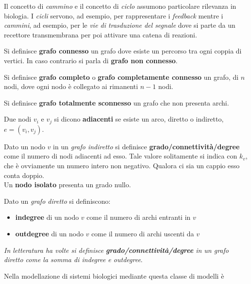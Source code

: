 \documentclass[a4paper,12pt, oneside]{book}
\begin{document}
Il concetto di \textit{cammino} e il concetto di \textit{ciclo} assumono
particolare rilevanza in biologia. I \textit{cicli} servono, ad esempio, per
rappresentare i \textit{feedback} mentre i \textit{cammini}, ad esempio, per le
\textit{vie di trasduzione del segnale} dove si parte da un recettore
transmembrana per poi attivare una catena di reazioni.
\begin{definizione}
  Si definisce \textbf{grafo connesso} un grafo dove esiste un percorso tra ogni
  coppia di vertici. In caso contrario si parla di \textbf{grafo non connesso}.
\end{definizione}
\begin{definizione}
  Si definisce \textbf{grafo completo} o \textbf{grafo completamente connesso}
  un grafo, di $n$ nodi, dove ogni nodo è collegato ai rimanenti $n-1$ nodi.
\end{definizione}
\begin{definizione}
  Si definisce \textbf{grafo totalmente sconnesso} un grafo che non presenta
  archi.  
\end{definizione}
\begin{definizione}
  Due nodi $v_i$ e $v_j$ si dicono \textbf{adiacenti} se esiste un arco, diretto
  o indiretto, $e=(v_i, v_j)$.
\end{definizione}
\begin{definizione}
  Dato un nodo $v$ in un \textit{grafo indiretto} si definisce
  \textbf{grado/connettività/degree} come il 
  numero di 
  nodi adiacenti ad esso. Tale valore solitamente si indica con $k_v$, che è
  ovviamente un numero intero non negativo. Qualora ci sia un cappio esso conta
  doppio.\\
  Un \textbf{nodo isolato} presenta un grado nullo.
\end{definizione}
\begin{definizione}
  Dato un \textit{grafo diretto} si definiscono:
  \begin{itemize}
    \item \textbf{indegree} di un nodo $v$ come il numero di archi entranti in $v$
    \item \textbf{outdegree} di un nodo $v$ come il numero di archi uscenti da $v$
  \end{itemize}
  \textit{In letteratura ha volte si definisce
    \textbf{grado/connettività/degree} in un grafo diretto come la somma di
    \emph{indegree} e \emph{outdegree}}.
\end{definizione}
Nella modellazione di sistemi biologici mediante questa classe di modelli è
\end{document}

